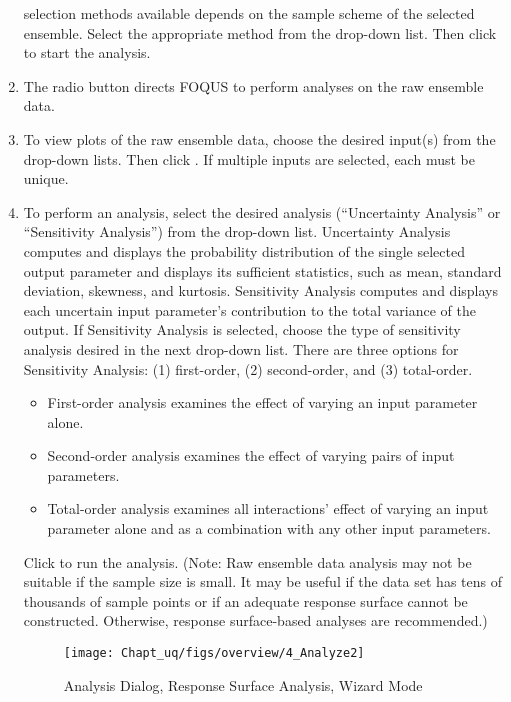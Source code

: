 \begin{enumerate}
	selection methods available depends on the sample scheme of the selected
	ensemble. Select the appropriate method from the  drop-down list. Then click  to
	start the analysis.
\item
	The  radio button directs FOQUS to perform analyses
	on the raw ensemble data.
\item
	To view plots of the raw ensemble data, choose the desired input(s) from
	the  drop-down lists. Then click .
   If multiple inputs are selected, each must be unique.
\item{To perform an analysis, select the desired analysis (``Uncertainty Analysis'' or
	``Sensitivity Analysis'') from the  drop-down list. Uncertainty
	Analysis computes and displays the probability distribution of the
	single selected output parameter and displays its sufficient statistics,
	such as mean, standard deviation, skewness, and kurtosis. Sensitivity Analysis computes and displays each uncertain input parameter's
	contribution to the total variance of the output. If Sensitivity Analysis is selected, choose the type of sensitivity analysis desired in the next drop-down list. There are three options for Sensitivity Analysis:
	(1) first-order, (2) second-order, and (3) total-order. 
	\begin{itemize}
		\item First-order analysis examines the effect of varying an input parameter alone.
		\item Second-order analysis examines the effect of varying pairs of input parameters.
		\item Total-order analysis examines all interactions' effect of
	         varying an input parameter alone and as a combination with any other
	         input parameters.
	\end{itemize}
	Click  to run the analysis. (Note: Raw ensemble data
	analysis may not be suitable if the sample size is small. It may be
	useful if the data set has tens of thousands of sample points or if an
	adequate response surface cannot be constructed. Otherwise, response
	surface-based analyses are recommended.)
   \begin{figure}[!htb]
		\centering \texttt{[image: Chapt\_uq/figs/overview/4\_Analyze2]}
		\caption{Analysis Dialog, Response Surface Analysis, Wizard Mode}

\end{figure}}
\end{enumerate}
